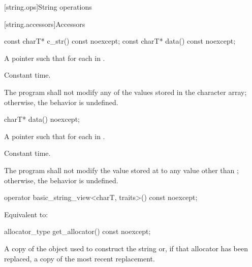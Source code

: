 [string.ops]{String operations}

[string.accessors]{Accessors}

%
%
\begin{itemdecl}
const charT* c_str() const noexcept;
const charT* data() const noexcept;
\end{itemdecl}

\begin{itemdescr}
\pnum
\returns A pointer  such that  for each
 in .

\pnum
\complexity Constant time.

\pnum
\remarks
The program shall not modify any of the values stored in the character array; otherwise, the behavior is undefined.
\end{itemdescr}

%
\begin{itemdecl}
charT* data() noexcept;
\end{itemdecl}

\begin{itemdescr}
\pnum
\returns A pointer  such that  for each
 in .

\pnum
\complexity Constant time.

\pnum
\remarks
The program shall not modify the value stored at 
to any value other than ; otherwise, the behavior is undefined.
\end{itemdescr}

%
\begin{itemdecl}
operator basic_string_view<charT, traits>() const noexcept;
\end{itemdecl}

\begin{itemdescr}
\pnum
\effects Equivalent to:
\end{itemdescr}

%
\begin{itemdecl}
allocator_type get_allocator() const noexcept;
\end{itemdecl}

\begin{itemdescr}
\pnum
\returns
A copy of the
object used to construct the string or, if that allocator has been replaced, a
copy of the most recent replacement.
\end{itemdescr}

